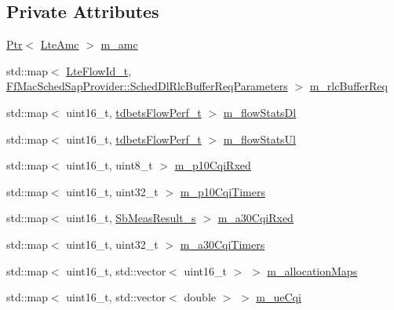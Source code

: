 \subsection*{Private Attributes}
\begin{DoxyCompactItemize}
\item 
\hyperlink{classns3_1_1Ptr}{Ptr}$<$ \hyperlink{classns3_1_1LteAmc}{Lte\+Amc} $>$ \hyperlink{classns3_1_1TdBetFfMacScheduler_a3ba724ed3776a6cb493df6dd91b810d6}{m\+\_\+amc}
\item 
std\+::map$<$ \hyperlink{structns3_1_1LteFlowId__t}{Lte\+Flow\+Id\+\_\+t}, \hyperlink{structns3_1_1FfMacSchedSapProvider_1_1SchedDlRlcBufferReqParameters}{Ff\+Mac\+Sched\+Sap\+Provider\+::\+Sched\+Dl\+Rlc\+Buffer\+Req\+Parameters} $>$ \hyperlink{classns3_1_1TdBetFfMacScheduler_a2c9685f472af05693a869d043fc1d35c}{m\+\_\+rlc\+Buffer\+Req}
\item 
std\+::map$<$ uint16\+\_\+t, \hyperlink{structns3_1_1tdbetsFlowPerf__t}{tdbets\+Flow\+Perf\+\_\+t} $>$ \hyperlink{classns3_1_1TdBetFfMacScheduler_a78d90d229bd176d578a607688cdf69a6}{m\+\_\+flow\+Stats\+Dl}
\item 
std\+::map$<$ uint16\+\_\+t, \hyperlink{structns3_1_1tdbetsFlowPerf__t}{tdbets\+Flow\+Perf\+\_\+t} $>$ \hyperlink{classns3_1_1TdBetFfMacScheduler_a192dacbea27307776249e60660fa005e}{m\+\_\+flow\+Stats\+Ul}
\item 
std\+::map$<$ uint16\+\_\+t, uint8\+\_\+t $>$ \hyperlink{classns3_1_1TdBetFfMacScheduler_a30205ddb38c83dab20b1c059df052679}{m\+\_\+p10\+Cqi\+Rxed}
\item 
std\+::map$<$ uint16\+\_\+t, uint32\+\_\+t $>$ \hyperlink{classns3_1_1TdBetFfMacScheduler_a1b59f4b00f23f363702a1c9679fe18a1}{m\+\_\+p10\+Cqi\+Timers}
\item 
std\+::map$<$ uint16\+\_\+t, \hyperlink{structns3_1_1SbMeasResult__s}{Sb\+Meas\+Result\+\_\+s} $>$ \hyperlink{classns3_1_1TdBetFfMacScheduler_a97570d78f267884fd17897979a0c1da8}{m\+\_\+a30\+Cqi\+Rxed}
\item 
std\+::map$<$ uint16\+\_\+t, uint32\+\_\+t $>$ \hyperlink{classns3_1_1TdBetFfMacScheduler_a7e0161875c90392333763dd0b96b405a}{m\+\_\+a30\+Cqi\+Timers}
\item 
std\+::map$<$ uint16\+\_\+t, std\+::vector$<$ uint16\+\_\+t $>$ $>$ \hyperlink{classns3_1_1TdBetFfMacScheduler_a058a5b7d1c7c507d3fe3d9d12cc24ab7}{m\+\_\+allocation\+Maps}
\item 
std\+::map$<$ uint16\+\_\+t, std\+::vector$<$ double $>$ $>$ \hyperlink{classns3_1_1TdBetFfMacScheduler_a869067679aa0a846212a1fb509c1d702}{m\+\_\+ue\+Cqi}

\end{DoxyCompactItemize}
